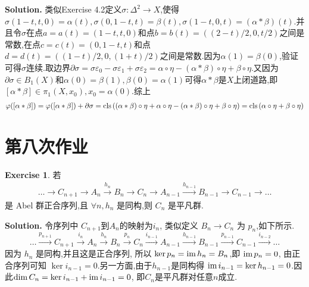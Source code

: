 \documentclass[a4paper]{book}
\newenvironment{solution}%
{\noindent\textbf{Solution.}}%
{\qedhere}
\numberwithin{equation}{chapter}
\theoremstyle{definition}
\newtheorem{exc}[exm]{Exercise}
\begin{document}
\begin{solution}
  类似Exercise 4.2定义$\sigma : \Delta^2 \rightarrow X$,使得$\sigma(1-t,t,0) = \alpha(t),\sigma(0,1-t,t) = \beta(t),\sigma(1-t,0,t) = (\alpha * \beta)(t) $.并且令$\sigma$在点$a = a(t) = (1-t,t,0)$和点$b = b(t) = ((2-t)/2,0,t/2)$之间是常数,在点$c = c(t) = (0,1-t,t)$和点$d = d(t) = ((1-t)/2,0,(1+t)/2)$之间是常数.因为$\alpha(1) = \beta(0)$,验证可得$\sigma$连续.取边界$\partial \sigma = \sigma \varepsilon_0 - \sigma \varepsilon_1 + \sigma \varepsilon_2 = \alpha \circ \eta - (\alpha * \beta) \circ \eta + \beta \circ \eta$.又因为$\partial \sigma \in B_1(X)$和$\alpha(0) = \beta(1), \beta(0) = \alpha(1)$可得$\alpha * \beta$是$X$上闭道路,即$[\alpha * \beta] \in \pi_1(X,x_0),x_0 = \alpha(0)$.综上
  \begin{align*}
    \varphi([\alpha * \beta]) = \varphi([\alpha * \beta]) + \partial \sigma = \textmd{cls}\,((\alpha * \beta) \circ \eta + \alpha \circ \eta - (\alpha * \beta) \circ \eta + \beta \circ \eta) = \textmd{cls}\,(\alpha \circ \eta + \beta \circ \eta) 
  \end{align*}
\end{solution}


\section{第八次作业}\label{sec:2}


\begin{exc}
  若
  \begin{align*}
        \dots \rightarrow C_{n+1} \rightarrow A_n \overset{h_n}{\rightarrow} B_n \rightarrow C_n   \rightarrow A_{n-1} \overset{h_{n-1}}{\rightarrow} B_{n-1} \rightarrow C_{n-1} \rightarrow \dots
  \end{align*}
  是 Abel 群正合序列,且 $\forall n, h_n$ 是同构,则 $C_n$ 是平凡群.
\end{exc}

\begin{solution}
  令序列中 $C_{n+1}$到$A_n$的映射为$i_n$, 类似定义 $B_n \rightarrow C_n$ 为 $p_n$,如下所示.
  \[\dots \overset{p_{n+1}}{\rightarrow} C_{n+1} \overset{i_n}{\rightarrow} A_n \overset{h_n}{\rightarrow} B_n \overset{p_{n}}{\rightarrow} C_n   \overset{i_{n-1}}{\rightarrow} A_{n-1} \overset{h_{n-1}}{\rightarrow} B_{n-1} \overset{p_{n-1}}{\rightarrow} C_{n-1} \overset{i_{n-2}}{\rightarrow} \dots \]
  因为 $h_n$ 是同构,并且这是正合序列, 所以 $\ker p_n = \textmd{im}\, h_n = B_n$,即 $\textmd{im}\, p_n = 0$, 由正合序列可知 $\ker i_{n-1} = 0$.另一方面,由于$h_{n-1}$是同构得 $\textmd{im}\, i_{n-1} = \ker h_{n-1} = 0$.因此$\dim C_n = \ker i_{n-1} + \textmd{im}\, i_{n-1} = 0$, 即$C_n$是平凡群对任意$n$成立.
\end{solution}
\end{document}
